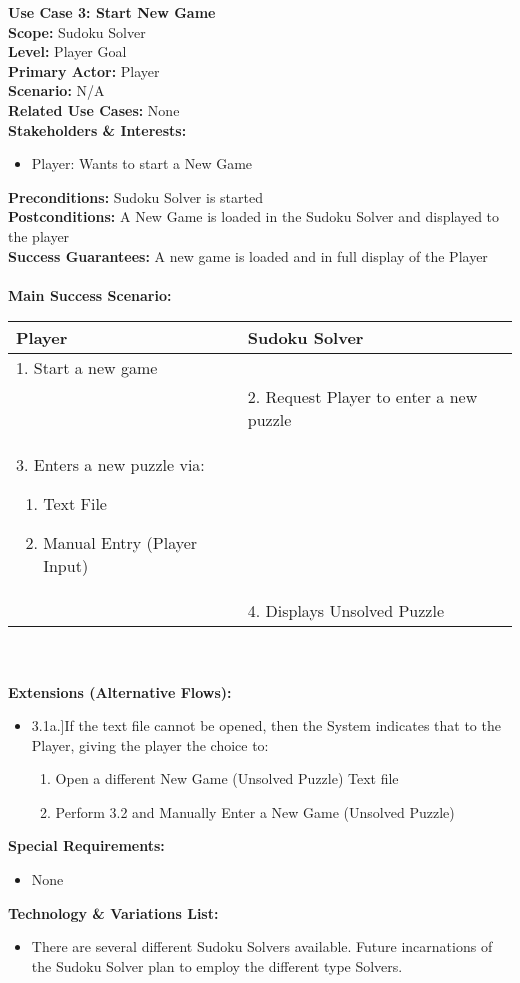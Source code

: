 \documentclass[letterpaper]{article}
\begin{document}
\noindent
\textbf{Use Case 3:  Start New Game}\\
\textbf{Scope:  }Sudoku Solver\\
\textbf{Level:  }Player Goal\\
\textbf{Primary Actor:  }Player\\
\textbf{Scenario:  }N/A\\
\textbf{Related Use Cases:  }None\\
\textbf{Stakeholders \& Interests:}
\begin{itemize}
\item Player:  Wants to start a New Game
\end{itemize}
\textbf{Preconditions:  }Sudoku Solver is started\\
\textbf{Postconditions:  }A New Game is loaded in the Sudoku Solver
and displayed to the player\\
\textbf{Success Guarantees: }A new game is loaded and in full display
of the Player\\\\
\textbf{Main Success Scenario:  }\\
\begin{tabular}{|p{5.75cm}|p{5.75cm}|}\hline
\textbf{Player} & \textbf{Sudoku Solver}\\\hline
1.  Start a new game & \\\hline
& 2. Request Player to enter a new puzzle\\\hline
3. Enters a new puzzle via:
\begin{enumerate}
\item Text File
\item Manual Entry (Player Input)
\end{enumerate} & \\\hline
& 4. Displays Unsolved Puzzle\\\hline
\end{tabular}\\\\
\textbf{Extensions (Alternative Flows):}
\begin{itemize}
\item[]3.1a.]If the text file cannot be opened, then the System
indicates that to the Player, giving the player the choice to:
\begin{enumerate}
\item Open a different New Game (Unsolved Puzzle) Text file
\item Perform 3.2 and Manually Enter a New Game (Unsolved Puzzle)
\end{enumerate}
\end{itemize}
\textbf{Special Requirements: }
\begin{itemize}
\item None
\end{itemize}
\textbf{Technology \& Variations List:}
\begin{itemize}
\item There are several different Sudoku Solvers available.  Future
incarnations of the Sudoku Solver plan to employ the different type
Solvers.
\end{itemize}
\end{document}
